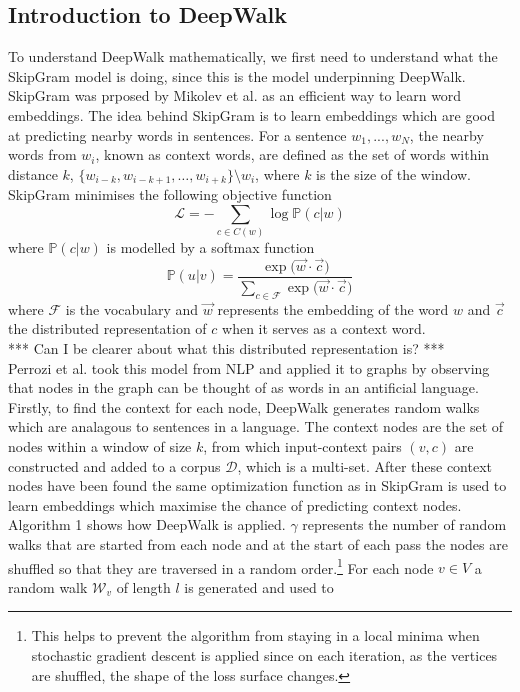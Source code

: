 \documentclass[a4paper]{article}
\renewcommand{\P}{\mathbb P}
\newcommand{\D}{\mathcal D}
\begin{document}
\subsection{Introduction to DeepWalk}
To understand DeepWalk mathematically, we first need to understand what the SkipGram
model is doing, since this is the model underpinning DeepWalk. SkipGram was
prposed by Mikolev et al.\cite{mikolov2013efficient} as an efficient way to
learn word embeddings. The idea behind SkipGram is to learn embeddings which are good at
predicting nearby words in sentences. For a sentence $w_1, ... , w_N$, the
nearby words from $w_i$, known as context words, are defined as the set of words
within distance $k$, $\{w_{i-k}, w_{i-k+1}, \dots , w_{i+k}\} \setminus w_i$, where $k$ is the size of the window. SkipGram
minimises the following objective function
\[\mathcal{L} = - \sum_{c \in C(w)} \log{\P(c | w)}\]
where $\P(c | w)$ is modelled by a softmax function
\[\P(u|v) = \frac{\exp{(\vec{w} \cdot \vec{c}})}{\sum_{c \in \mathcal{F}}\exp{(\vec{w} \cdot
    \vec{c}})}\]
where $\mathcal{F}$ is the vocabulary and $\vec{w}$ represents the
embedding of the word $w$ and $\vec{c}$ the distributed representation of $c$ when it serves as a
context word.\\
*** Can I be clearer about what this distributed representation is? ***\\
Perrozi et al. took this model from NLP and applied it to graphs by observing
that nodes in the graph can be thought of as words in an antificial language.
Firstly, to find the context for each node, DeepWalk generates random walks
which are analagous to sentences in a language. The context nodes are the set of
nodes within a window of size $k$, from which input-context pairs $(v, c)$ are
constructed and added to a corpus $\D$, which is a multi-set. After these context nodes have been
found the same optimization function as in SkipGram is used to learn embeddings which maximise
the chance of predicting context nodes.\\
Algorithm 1 shows how DeepWalk is applied. $\gamma$ represents the number of
random walks that are started from each node and at the start of each pass the
nodes are shuffled so that they are traversed in a random order.\footnote{This
  helps to prevent the algorithm from staying in a local minima when stochastic
  gradient descent is applied since on each iteration, as the vertices
  are shuffled, the shape of the loss surface changes.} For each node
$v \in V$ a random walk $\mathcal{W}_v$ of length $l$ is generated and used to
\end{document}
